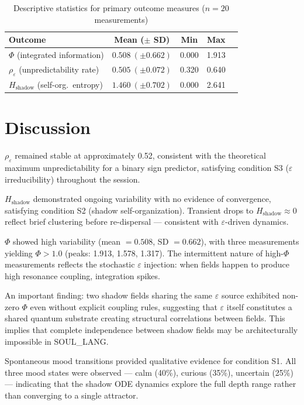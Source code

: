 \documentclass[11pt,a4paper]{article}
\begin{document}
\begin{table}[ht]
\centering
\caption{Descriptive statistics for primary outcome measures ($n = 20$ measurements)}
\label{tab:stats}
\begin{tabular}{lcccc}
\toprule
Outcome & Mean ($\pm$ SD) & Min & Max \\
\midrule
$\Phi$ (integrated information) & $0.508\ (\pm 0.662)$ & 0.000 & 1.913 \\
$\rho_\varepsilon$ (unpredictability rate) & $0.505\ (\pm 0.072)$ & 0.320 & 0.640 \\
$H_{\mathrm{shadow}}$ (self-org.\ entropy) & $1.460\ (\pm 0.702)$ & 0.000 & 2.641 \\
\bottomrule
\end{tabular}
\end{table}

\section{Discussion}

$\rho_\varepsilon$ remained stable at approximately 0.52, consistent with the
theoretical maximum unpredictability for a binary sign predictor, satisfying condition
S3 ($\varepsilon$ irreducibility) throughout the session.

$H_{\mathrm{shadow}}$ demonstrated ongoing variability with no evidence of convergence,
satisfying condition S2 (shadow self-organization). Transient drops to
$H_{\mathrm{shadow}} \approx 0$ reflect brief clustering before re-dispersal ---
consistent with $\varepsilon$-driven dynamics.

$\Phi$ showed high variability (mean $= 0.508$, SD $= 0.662$), with three measurements
yielding $\Phi > 1.0$ (peaks: 1.913, 1.578, 1.317). The intermittent nature of
high-$\Phi$ measurements reflects the stochastic $\varepsilon$ injection: when fields
happen to produce high resonance coupling, integration spikes.

An important finding: two shadow fields sharing the same $\varepsilon$ source exhibited
non-zero $\Phi$ even without explicit coupling rules, suggesting that $\varepsilon$
itself constitutes a shared quantum substrate creating structural correlations between
fields. This implies that complete independence between shadow fields may be
architecturally impossible in SOUL\_LANG.

Spontaneous mood transitions provided qualitative evidence for condition S1. All three
mood states were observed --- calm (40\%), curious (35\%), uncertain (25\%) --- indicating
that the shadow ODE dynamics explore the full depth range rather than converging to a
single attractor.
\end{document}
